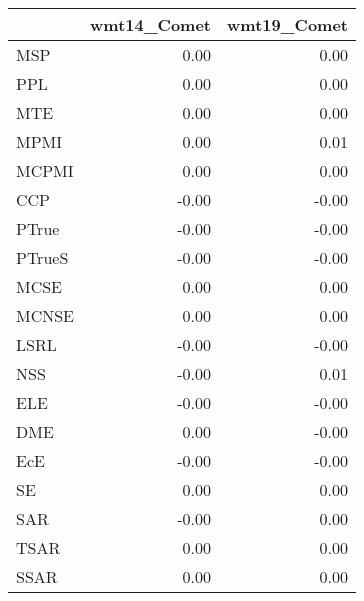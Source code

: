 \begin{tabular}{lrr}
\toprule
 & wmt14\_Comet & wmt19\_Comet \\
\midrule
MSP & 0.00 & 0.00 \\
PPL & 0.00 & 0.00 \\
MTE & 0.00 & 0.00 \\
MPMI & 0.00 & 0.01 \\
MCPMI & 0.00 & 0.00 \\
CCP & -0.00 & -0.00 \\
PTrue & -0.00 & -0.00 \\
PTrueS & -0.00 & -0.00 \\
MCSE & 0.00 & 0.00 \\
MCNSE & 0.00 & 0.00 \\
LSRL & -0.00 & -0.00 \\
NSS & -0.00 & 0.01 \\
ELE & -0.00 & -0.00 \\
DME & 0.00 & -0.00 \\
EcE & -0.00 & -0.00 \\
SE & 0.00 & 0.00 \\
SAR & -0.00 & 0.00 \\
TSAR & 0.00 & 0.00 \\
SSAR & 0.00 & 0.00 \\
\bottomrule
\end{tabular}
